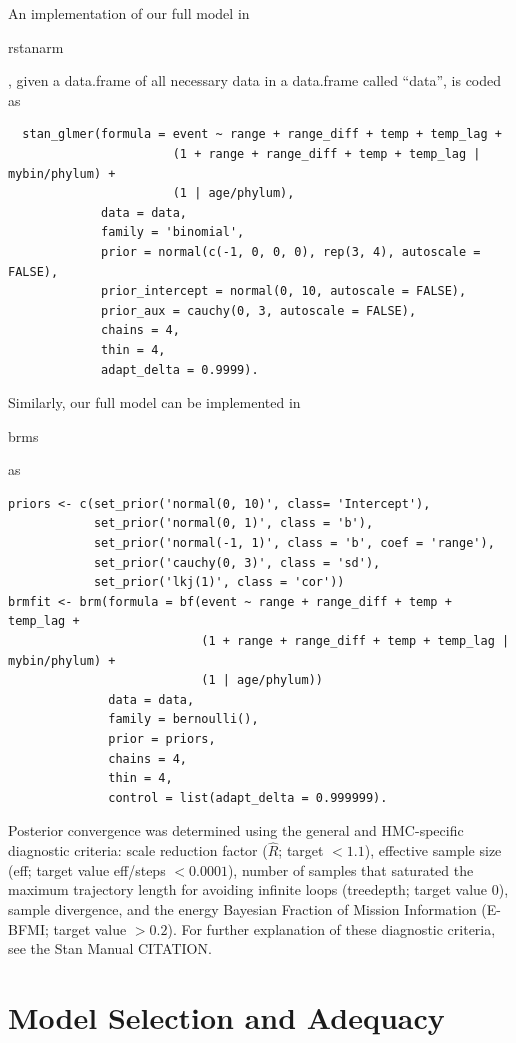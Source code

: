 \documentclass[12pt,letterpaper]{article}
\begin{document}
An implementation of our full model in \begin{texttt}rstanarm\end{texttt}, given a data.frame of all necessary data in a data.frame called ``data'', is coded as
\begin{verbatim}
  stan_glmer(formula = event ~ range + range_diff + temp + temp_lag + 
                       (1 + range + range_diff + temp + temp_lag | mybin/phylum) + 
                       (1 | age/phylum), 
             data = data, 
             family = 'binomial',
             prior = normal(c(-1, 0, 0, 0), rep(3, 4), autoscale = FALSE), 
             prior_intercept = normal(0, 10, autoscale = FALSE), 
             prior_aux = cauchy(0, 3, autoscale = FALSE), 
             chains = 4,
             thin = 4,
             adapt_delta = 0.9999).
\end{verbatim}

Similarly, our full model can be implemented in \begin{texttt}brms\end{texttt} as
\begin{verbatim}
priors <- c(set_prior('normal(0, 10)', class= 'Intercept'),
            set_prior('normal(0, 1)', class = 'b'),
            set_prior('normal(-1, 1)', class = 'b', coef = 'range'),
            set_prior('cauchy(0, 3)', class = 'sd'),
            set_prior('lkj(1)', class = 'cor'))
brmfit <- brm(formula = bf(event ~ range + range_diff + temp + temp_lag +
                           (1 + range + range_diff + temp + temp_lag | mybin/phylum) +
                           (1 | age/phylum))
              data = data, 
              family = bernoulli(), 
              prior = priors,
              chains = 4, 
              thin = 4,
              control = list(adapt_delta = 0.999999).
\end{verbatim}

Posterior convergence was determined using the general and HMC-specific diagnostic criteria: scale reduction factor (\(\hat{R}\); target \(<1.1\)), effective sample size (eff; target value eff/steps \(<0.0001\)), number of samples that saturated the maximum trajectory length for avoiding infinite loops (treedepth; target value 0), sample divergence, and the energy Bayesian Fraction of Mission Information (E-BFMI; target value \(>0.2\)). For further explanation of these diagnostic criteria, see the Stan Manual CITATION.


\section{Model Selection and Adequacy}
\end{document}
